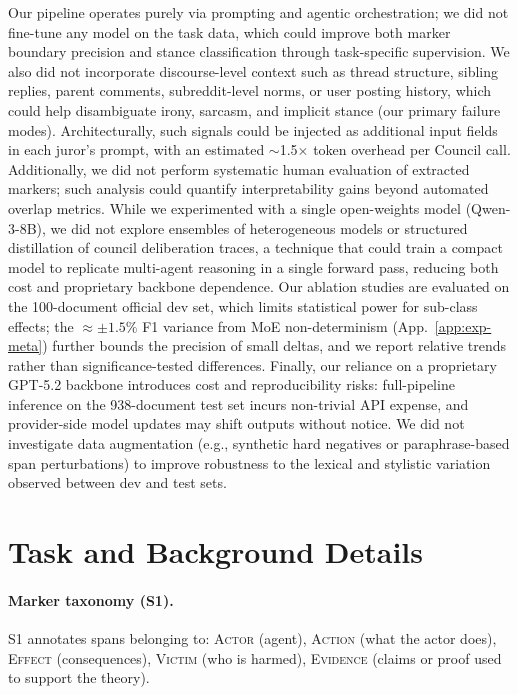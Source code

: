 \documentclass[11pt]{article}
\begin{document}
Our pipeline operates purely via prompting and agentic orchestration; we did not fine-tune any model on the task data, which could improve both marker boundary precision and stance classification through task-specific supervision.
We also did not incorporate discourse-level context such as thread structure, sibling replies, parent comments, subreddit-level norms, or user posting history, which could help disambiguate irony, sarcasm, and implicit stance (our primary failure modes). Architecturally, such signals could be injected as additional input fields in each juror's prompt, with an estimated $\sim$1.5$\times$ token overhead per Council call.
Additionally, we did not perform systematic human evaluation of extracted markers; such analysis could quantify interpretability gains beyond automated overlap metrics.
While we experimented with a single open-weights model (Qwen-3-8B), we did not explore ensembles of heterogeneous models or structured distillation of council deliberation traces, a technique that could train a compact model to replicate multi-agent reasoning in a single forward pass, reducing both cost and proprietary backbone dependence.
Our ablation studies are evaluated on the 100-document official dev set, which limits statistical power for sub-class effects; the $\approx \pm 1.5\%$ F1 variance from MoE non-determinism (App.~\ref{app:exp-meta}) further bounds the precision of small deltas, and we report relative trends rather than significance-tested differences.
Finally, our reliance on a proprietary GPT-5.2 backbone introduces cost and reproducibility risks: full-pipeline inference on the 938-document test set incurs non-trivial API expense, and provider-side model updates may shift outputs without notice. We did not investigate data augmentation (e.g., synthetic hard negatives or paraphrase-based span perturbations) to improve robustness to the lexical and stylistic variation observed between dev and test sets.







\appendix
\newpage
{}

\section{Task and Background Details}
\label{app:task-details}

\paragraph{Marker taxonomy (S1).}
S1 annotates spans belonging to: \textsc{Actor} (agent), \textsc{Action} (what
the actor does), \textsc{Effect} (consequences), \textsc{Victim} (who is
harmed), \textsc{Evidence} (claims or proof used to support the theory).
\end{document}
